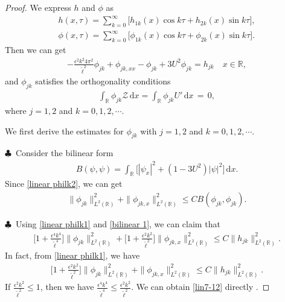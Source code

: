\documentclass[10pt,a4paper]{amsart}
\begin{document}
\begin{proof}
 We express $h$ and $\phi$ as
\begin{align} \label{fourier-h}
 h(x, \tau) = \sum_{k=0}^\infty \Big[h_{1k} (x)\cos k\tau + h_{2k} (x)\sin k\tau\Big],
 \\[2mm]
 \label{fourier-phi}\phi(x, \tau) = \sum_{k=0}^\infty \Big[\phi_{1k} (x)\cos k\tau + \phi_{2k} (x)\sin k\tau\Big].
\end{align}
 Then we can  get
\begin{align} \label{linear philk1}
 - \frac{\epsilon^2k^2 4\pi^2}{{\tilde\ell}^2}\phi_{jk}+ \phi_{jk, xx} - \phi_{jk}+3U^2\phi_{jk} = h_{jk}\quad x\in {\mathbb R},
\end{align}
and $\phi_{jk}$ satisfies the orthogonality conditions
\begin{align} \label{linear philk2}
 \int_{\mathbb R}\phi_{jk}{\mathcal Z} \,{\mathrm d}x= \int_{\mathbb R}\phi_{jk} U' \,{\mathrm d}x \,=\, 0,
\end{align}
where $j=1,2$ and $k=0,1,2,\cdots$.

We first derive the estimates for $\phi_{jk}$ with $j=1,2$ and $k=0,1,2,\cdots$.

\smallskip\noindent$\clubsuit$\
 Consider the bilinear form
\begin{align*}
 B(\psi, \psi) = \int_{\mathbb R}\Big[|\psi_x|^2+ (1-3U^2)|\psi|^2 \Big] \,{\mathrm d}x.
\end{align*}
Since \eqref{linear philk2}, we can get
\begin{align} \label{bilinear 1}
 \|\phi_{jk}\|^2_{L^2({\mathbb R})} + \|\phi_{jk, x}\|^2_{L^2({\mathbb R})} \leq C B(\phi_{jk}, \phi_{jk}).
\end{align}

\smallskip\noindent$\clubsuit$\
Using \eqref{linear philk1} and \eqref{bilinear 1}, we can  claim that
\begin{align} \label{lin7-12}
\Bigg[1+\frac{\epsilon^4k^4}{{\tilde\ell}^4}\Bigg] \|\phi_{jk}\|^2_{L^2({\mathbb R})}
+ \Bigg[1+\frac{\epsilon^2k^2}{{\tilde\ell}^2}\Bigg] \|\phi_{jk, x}\|^2_{L^2({\mathbb R})} \leq C\|h_{jk}\|^2_{L^2({\mathbb R})}.
\end{align}
In fact, from \eqref{linear philk1}, we have
\begin{align*}
 \Bigg[1+\frac{\epsilon^2k^2}{{\tilde\ell}^2}\Bigg] \|\phi_{jk}\|^2_{L^2({\mathbb R})} + \|\phi_{jk, x}\|^2_{L^2({\mathbb R})} \leq C\|h_{jk}\|^2_{L^2({\mathbb R})}.
\end{align*}
 If $ \frac{\epsilon^2k^2}{{\tilde\ell}^2} \leq 1$, then we have $ \frac{\epsilon^4k^4}{{\tilde\ell}^4} \leq \frac{\epsilon^2k^2}{{\tilde\ell}^2}$. We can obtain \eqref{lin7-12}  directly .


\end{proof}
\end{document}
